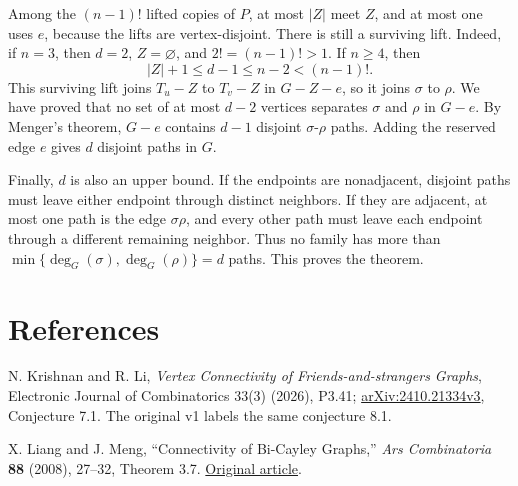 \documentclass[11pt]{article}
\begin{document}
Among the \((n-1)!\) lifted copies of \(P\), at most \(|Z|\) meet \(Z\), and at most one uses \(e\), because the lifts are vertex-disjoint. There is still a surviving lift. Indeed, if \(n=3\), then \(d=2\), \(Z=\varnothing\), and \(2!=(n-1)!>1\). If \(n\geq4\), then
\[
|Z|+1\leq d-1\leq n-2<(n-1)!.
\]
This surviving lift joins \(T_u-Z\) to \(T_v-Z\) in \(G-Z-e\), so it joins \(\sigma\) to \(\rho\). We have proved that no set of at most \(d-2\) vertices separates \(\sigma\) and \(\rho\) in \(G-e\). By Menger's theorem, \(G-e\) contains \(d-1\) disjoint \(\sigma\)-\(\rho\) paths. Adding the reserved edge \(e\) gives \(d\) disjoint paths in \(G\).

Finally, \(d\) is also an upper bound. If the endpoints are nonadjacent, disjoint paths must leave either endpoint through distinct neighbors. If they are adjacent, at most one path is the edge \(\sigma\rho\), and every other path must leave each endpoint through a different remaining neighbor. Thus no family has more than \(\min\{\deg_G(\sigma),\deg_G(\rho)\}=d\) paths. This proves the theorem.

\section*{References}

N. Krishnan and R. Li, \emph{Vertex Connectivity of Friends-and-strangers Graphs}, Electronic Journal of Combinatorics 33(3) (2026), P3.41; \href{https://arxiv.org/abs/2410.21334v3}{arXiv:2410.21334v3}, Conjecture 7.1. The original v1 labels the same conjecture 8.1.

X. Liang and J. Meng, ``Connectivity of Bi-Cayley Graphs,'' \emph{Ars Combinatoria} \textbf{88} (2008), 27--32, Theorem 3.7. \href{https://combinatorialpress.com/article/ars/Volume\%20088/volume-88-paper-3.pdf}{Original article}.
\end{document}
